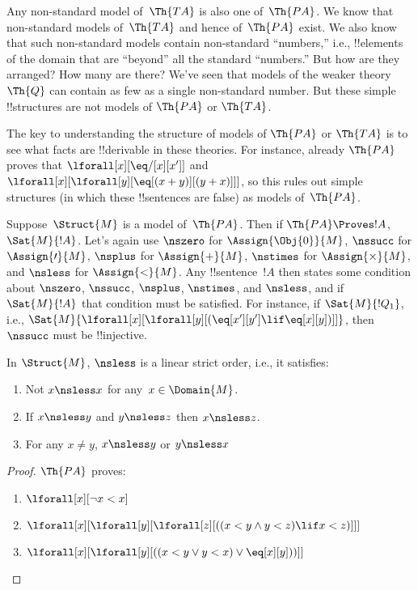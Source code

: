 \documentclass[../../../include/open-logic-section]{subfiles}
\begin{document}

\begin{explain}
Any non-standard model of~$\Th{TA}$ is also one of~$\Th{PA}$. We know
that non-standard models of~$\Th{TA}$ and hence of~$\Th{PA}$ exist. We
also know that such non-standard models contain non-standard
``numbers,'' i.e., !!{element}s of the domain that are ``beyond'' all
the standard ``numbers.''  But how are they arranged? How many are
there? We've seen that models of the weaker theory~$\Th{Q}$ can
contain as few as a single non-standard number. But these simple
!!{structure}s are not models of $\Th{PA}$ or $\Th{TA}$.

The key to understanding the structure of models of $\Th{PA}$ or
$\Th{TA}$ is to see what facts are !!{derivable} in these theories.
For instance, already $\Th{PA}$ proves that $\lforall[x][\eq/[x][x']]$
and $\lforall[x][\lforall[y][\eq[(x+y)][(y+x)]]]$, so this rules out
simple structures (in which these !!{sentence}s are false) as models
of~$\Th{PA}$.

Suppose~$\Struct{M}$ is a model of~$\Th{PA}$. Then if $\Th{PA} \Proves
!A$, $\Sat{M}{!A}$.  Let's again use $\nszero$ for
$\Assign{\Obj{0}}{M}$, $\nssucc$ for $\Assign{\prime}{M}$, $\nsplus$
for $\Assign{+}{M}$, $\nstimes$ for $\Assign{\times}{M}$, and
$\nsless$ for $\Assign{<}{M}$. Any !!{sentence}~$!A$ then states some
condition about $\nszero$, $\nssucc$, $\nsplus$, $\nstimes$, and
$\nsless$, and if $\Sat{M}{!A}$ that condition must be satisfied. For
instance, if $\Sat{M}{!Q_1}$, i.e.,
$\Sat{M}{\lforall[x][\lforall[y][(\eq[x'][y'] \lif \eq[x][y])]]}$,
then $\nssucc$ must be !!{injective}.
\end{explain}

\begin{prop}
In $\Struct{M}$, $\nsless$ is a linear strict order, i.e., it
satisfies:
\begin{enumerate}
\item Not $x \nsless x$ for any~$x \in \Domain{M}$.
\item If $x \nsless y$ and $y \nsless z$ then $x \nsless z$.
\item For any $x \neq y$, $x \nsless y$ or $y \nsless x$
\end{enumerate}
\end{prop}

\begin{proof}
$\Th{PA}$ proves:
\begin{enumerate}
\item $\lforall[x][\lnot x < x]$
\item $\lforall[x][\lforall[y][\lforall[z][((x < y \land y < z) \lif x < z)]]]$
\item $\lforall[x][\lforall[y][((x < y \lor y < x) \lor \eq[x][y]))]]$
\end{enumerate}
\end{proof}
\end{document}
